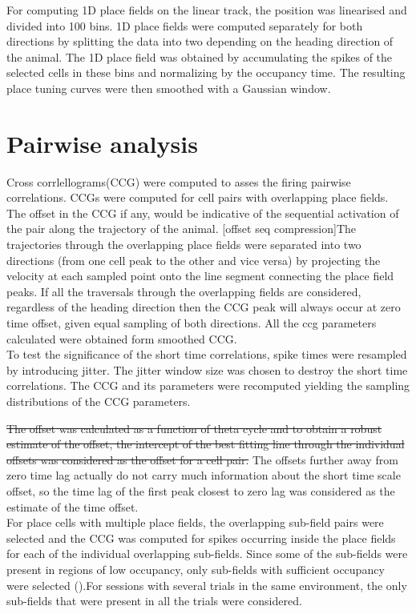 For computing 1D place fields on the linear track, the position was linearised and divided into 100 bins.
1D place fields were computed separately for both directions by splitting the data into two depending on the heading direction of the animal. The 1D place field was obtained by accumulating the spikes of the selected cells in these bins and normalizing by the occupancy  time. The resulting place tuning curves were then smoothed with a Gaussian window.\\

\section{Pairwise analysis}
Cross corrlellograms(CCG) were computed to asses the firing pairwise correlations. CCGs were computed for cell pairs with overlapping place fields. The offset in the CCG if any, would be indicative of the sequential activation of the pair along the trajectory of the animal. [offset seq compression]The trajectories through the overlapping place fields were separated into two directions (from one cell peak to the other and vice versa) by projecting the velocity at each sampled point onto the line segment connecting the place field peaks. If all the traversals through the overlapping fields are considered, regardless of the heading direction then the CCG peak will always occur at zero time offset, given equal sampling of both directions. All the ccg parameters calculated were obtained form smoothed CCG. \\
To test the significance of the short time correlations, spike times were resampled by introducing jitter. The jitter window size was chosen to destroy the short time correlations. The CCG and its parameters were recomputed yielding the sampling distributions of the CCG parameters.

\st{The offset was calculated as a function of theta cycle and to obtain a robust estimate of the offset, the intercept of the best fitting line through the individual offsets was considered as the offset for a cell pair.} 
The offsets further away from zero time lag actually do not carry much information about the short time scale offset, so the time lag of the first peak closest to zero lag was considered as the estimate of the time  offset. \\
For place cells with multiple place fields, the overlapping sub-field pairs were selected and the CCG was computed for spikes occurring inside the place fields for each of the individual overlapping sub-fields. Since some of the sub-fields were present in regions of low occupancy, only sub-fields with sufficient occupancy were selected ().For sessions with several trials in the same environment, the only sub-fields that were present in all the trials were considered. \\ [overlapping contours  and sub-contours, peak distances]

